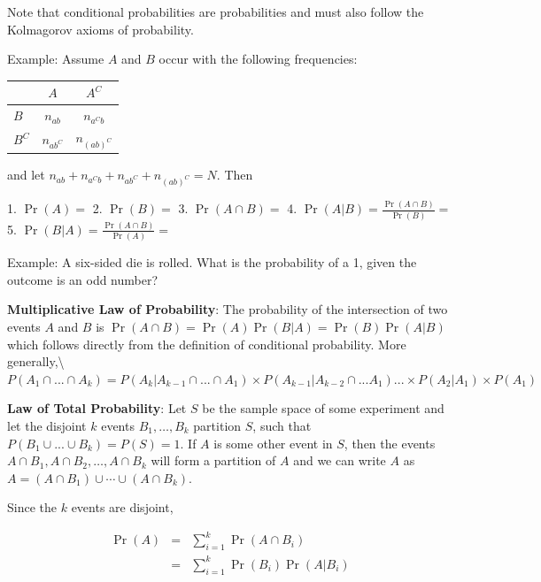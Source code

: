 \documentclass[]{book}
\theoremstyle{definition}
\theoremstyle{definition}
\theoremstyle{definition}
\theoremstyle{remark}
\begin{document}
Note that conditional probabilities are probabilities and must also
follow the Kolmagorov axioms of probability.

\begin{framed}
Example:  Assume $A$ and $B$ occur with the following frequencies: $\quad$

\begin{tabular}{lcc}
         & $A$          & $A^C$ \\\hline
$B$      & $n_{ab}$     & $n_{a^Cb}$ \\
$B^C$ & $n_{ab^C}$ & $n_{(ab)^C}$
\end{tabular}


and let $n_{ab}+n_{a^Cb}+n_{ab^C}+n_{(ab)^C}=N$.  Then

1. $\Pr(A)= $ 
2.  $\Pr(B)= $ 
3.  $\Pr(A\cap B)= $ 
4.  $\Pr(A|B)= \frac{\Pr(A\cap B)}{\Pr(B)}=  $ 
5.  $\Pr(B|A)= \frac{\Pr(A\cap B)}{\Pr(A)}= $ 
\end{framed}

\begin{framed}
Example:  A six-sided die is rolled.  What is the probability of a 1, given the outcome is an odd number? 

\end{framed}

\textbf{Multiplicative Law of Probability}: The probability of the
intersection of two events \(A\) and \(B\) is
\(\Pr(A\cap B)=\Pr(A)\Pr(B|A)=\Pr(B)\Pr(A|B)\) which follows directly
from the definition of conditional probability. More
generally,\textbackslash{}
\(P(A_1\cap ...\cap A_k) = P(A_k| A_{k-1}\cap... \cap A_1)\times P(A_{k-1}|A_{k-2}\cap ...A_1)...\times P(A_2|A_1)\times P(A_1)\)

\textbf{Law of Total Probability}: Let \(S\) be the sample space of some
experiment and let the disjoint \(k\) events \(B_1,\ldots,B_k\)
partition \(S\), such that \(P(B_1\cup ... \cup B_k) = P(S) = 1\). If
\(A\) is some other event in \(S\), then the events
\(A\cap B_1, A\cap B_2, \ldots, A\cap B_k\) will form a partition of
\(A\) and we can write \(A\) as
\(A=(A\cap B_1)\cup\cdots\cup (A\cap B_k)\).

Since the \(k\) events are disjoint,

\begin{eqnarray*}
\Pr(A)&=&\sum\limits_{i=1}^k \Pr(A \cap B_i)\\
      &=&\sum\limits_{i=1}^k \Pr(B_i)\Pr(A|B_i)
\end{eqnarray*}
\end{document}
